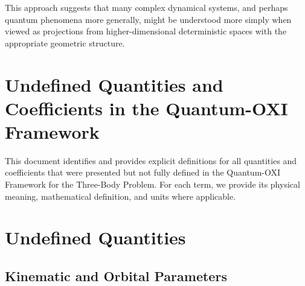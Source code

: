 \documentclass{article}
\begin{document}
This approach suggests that many complex dynamical systems, and perhaps quantum phenomena more generally, might be understood more simply when viewed as projections from higher-dimensional deterministic spaces with the appropriate geometric structure.







\section{Undefined Quantities and Coefficients in the Quantum-OXI Framework}

This document identifies and provides explicit definitions for all quantities and coefficients that were presented but not fully defined in the Quantum-OXI Framework for the Three-Body Problem. For each term, we provide its physical meaning, mathematical definition, and units where applicable.

\section{Undefined Quantities}

\subsection{Kinematic and Orbital Parameters}
\end{document}
